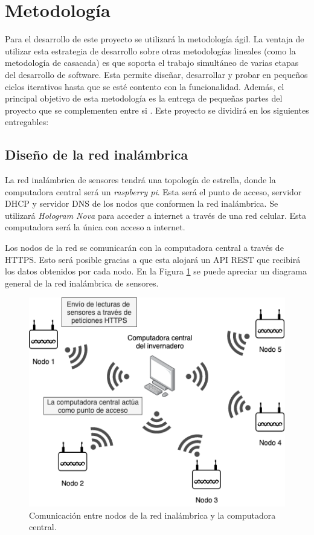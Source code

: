 \section{Metodología}

Para el desarrollo de este proyecto se utilizará la metodología ágil. La ventaja de utilizar esta estrategia de desarrollo sobre otras metodologías lineales (como la metodología de casacada) es que soporta el trabajo simultáneo de varias etapas del desarrollo de software. Esta permite diseñar, desarrollar y probar en pequeños ciclos iterativos hasta que se esté contento con la funcionalidad. Además, el principal objetivo de esta metodología es la entrega de pequeñas partes del proyecto que se complementen entre si \cite{what_is_agile_meth}. Este proyecto se dividirá en los siguientes entregables:

\subsection{Diseño de la red inalámbrica}
La red inalámbrica de sensores tendrá una topología de estrella, donde la computadora central será un \textit{raspberry pi}. Esta será el punto de acceso, servidor DHCP y servidor DNS de los nodos que conformen la red inalámbrica. Se utilizará \textit{Hologram Nova} para acceder a internet a través de una red celular. Esta computadora será la única con acceso a internet.

Los nodos de la red se comunicarán con la computadora central a través de HTTPS. Esto será posible gracias a que esta alojará un API REST que recibirá los datos obtenidos por cada nodo. En la Figura \ref{fig:coms_nodos_raspberry} se puede apreciar un diagrama general de la red inalámbrica de sensores.

\begin{figure}[!ht]
	\centering
	\includegraphics[width=.60\linewidth]{imagenes/diagramas/comunicacion_nodos_raspberry.png}
	\caption{Comunicación entre nodos de la red inalámbrica y la computadora central.}
	\label{fig:coms_nodos_raspberry}
\end{figure}

